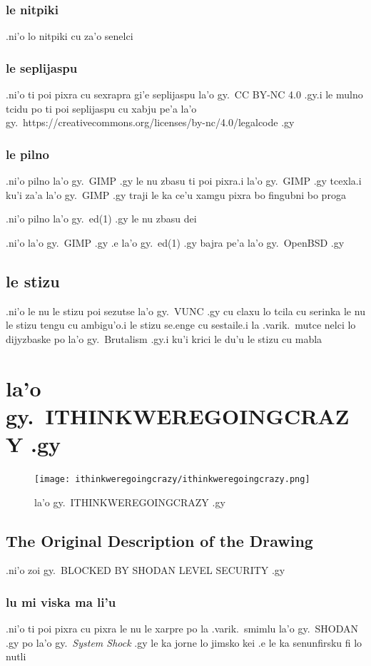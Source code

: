 \documentclass{report}
\begin{document}
\subsection{le nitpiki}
.ni'o lo nitpiki cu za'o senelci
\subsection{le seplijaspu}
.ni'o ti poi pixra cu sexrapra gi'e seplijaspu la'o gy.\ CC BY-NC 4.0 .gy\@ .i le mulno tcidu po ti poi seplijaspu cu xabju pe'a la'o gy.\ https://creativecommons.org/licenses/by-nc/4.0/legalcode .gy
\subsection{le pilno}
.ni'o pilno la'o gy.\ GIMP .gy le nu zbasu ti poi pixra\@  .i la'o gy.\ GIMP .gy tcexla\@  .i ku'i za'a la'o gy.\ GIMP .gy traji le ka ce'u xamgu pixra bo fingubni bo proga

.ni'o pilno la'o gy.\ ed(1) .gy le nu zbasu dei

.ni'o la'o gy.\ GIMP .gy .e la'o gy.\ ed(1) .gy bajra pe'a la'o gy.\ OpenBSD .gy
\section{le stizu}
.ni'o le nu le stizu poi sezutse la'o gy.\ VUNC .gy cu claxu lo tcila cu serinka le nu le stizu tengu cu ambigu'o\@  .i le stizu se.enge cu sestaile\@  .i la .varik.\ mutce nelci lo dijyzbaske po la'o gy.\ Brutalism .gy\@  .i ku'i krici le du'u le stizu cu mabla
\chapter{la'o gy.\ ITHINKWEREGOINGCRAZY .gy}
\begin{figure}[ht]
	\centering
	\texttt{[image: ithinkweregoingcrazy/ithinkweregoingcrazy.png]}
	\caption[center]{la'o gy.\ ITHINKWEREGOINGCRAZY .gy}
\end{figure}
\section{The Original Description of the Drawing}
.ni'o zoi gy.\ BLOCKED BY SHODAN LEVEL SECURITY .gy
\subsection{lu mi viska ma li'u}
.ni'o ti poi pixra cu pixra le nu le xarpre po la .varik.\ smimlu la'o gy.\ SHODAN .gy po la'o gy.\ \textit{System Shock} .gy le ka jorne lo jimsko kei .e le ka senunfirsku fi lo nutli
\end{document}
